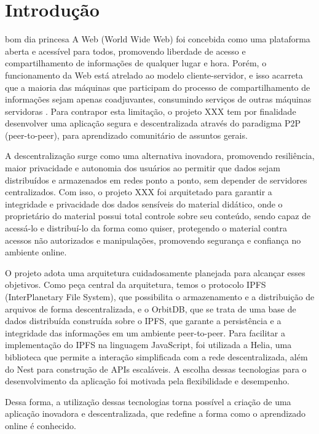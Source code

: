 \chapter[Introdução]{Introdução}
bom dia princesa
A Web (World Wide Web) foi concebida como uma plataforma aberta e acessível para todos, promovendo liberdade de acesso e compartilhamento de informações de qualquer lugar e hora. 
Porém, o funcionamento da Web está atrelado ao modelo cliente-servidor, e isso acarreta que a maioria das máquinas que participam do processo de compartilhamento de informações sejam apenas coadjuvantes, consumindo serviços de outras máquinas servidoras \cite{rocha2004p2p}. Para contrapor esta limitação, o projeto XXX tem por finalidade desenvolver uma aplicação segura e descentralizada através do paradigma P2P (peer-to-peer), para aprendizado comunitário de assuntos gerais.

A descentralização surge como uma alternativa inovadora, promovendo resiliência, maior privacidade e autonomia dos usuários ao permitir que dados sejam distribuídos e armazenados em redes ponto a ponto, sem depender de servidores centralizados. Com isso, o projeto XXX foi arquitetado para garantir a integridade e privacidade dos dados sensíveis do material didático, onde o proprietário do material possui total controle sobre seu conteúdo, sendo capaz de acessá-lo e distribuí-lo da forma como quiser, protegendo o material contra acessos não autorizados e manipulações, promovendo segurança e confiança no ambiente online.

O projeto adota uma arquitetura cuidadosamente planejada para alcançar esses objetivos. Como peça central da arquitetura, temos o protocolo IPFS (InterPlanetary File System), que possibilita o armazenamento e a distribuição de arquivos de forma descentralizada, e o OrbitDB, que se trata de uma base de dados distribuída construída sobre o IPFS, que garante a persistência e a integridade das informações em um ambiente peer-to-peer. Para facilitar a implementação do IPFS na linguagem JavaScript, foi utilizada a Helia, uma biblioteca que permite a interação simplificada com a rede descentralizada, além do Nest para construção de APIs escaláveis. A escolha dessas tecnologias para o desenvolvimento da aplicação foi motivada pela flexibilidade e desempenho.

Dessa forma, a utilização dessas tecnologias torna possível a criação de uma aplicação inovadora e descentralizada, que redefine a forma como o aprendizado online é conhecido.

